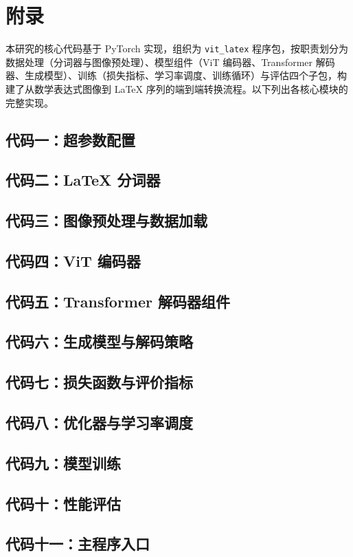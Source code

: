 \appendix
\renewcommand{\thesubsection}{\Alph{subsection}} %
\section*{\heiti{}附\qquad 录}
本研究的核心代码基于 PyTorch 实现，组织为 \texttt{vit\_latex} 程序包，按职责划分为数据处理（分词器与图像预处理）、模型组件（ViT 编码器、Transformer 解码器、生成模型）、训练（损失指标、学习率调度、训练循环）与评估四个子包，构建了从数学表达式图像到 LaTeX 序列的端到端转换流程。以下列出各核心模块的完整实现。
\subsection{代码一：超参数配置}

\subsection{代码二：LaTeX 分词器}

\subsection{代码三：图像预处理与数据加载}

\subsection{代码四：ViT 编码器}

\subsection{代码五：Transformer 解码器组件}

\subsection{代码六：生成模型与解码策略}

\subsection{代码七：损失函数与评价指标}

\subsection{代码八：优化器与学习率调度}

\subsection{代码九：模型训练}

\subsection{代码十：性能评估}

\subsection{代码十一：主程序入口}

